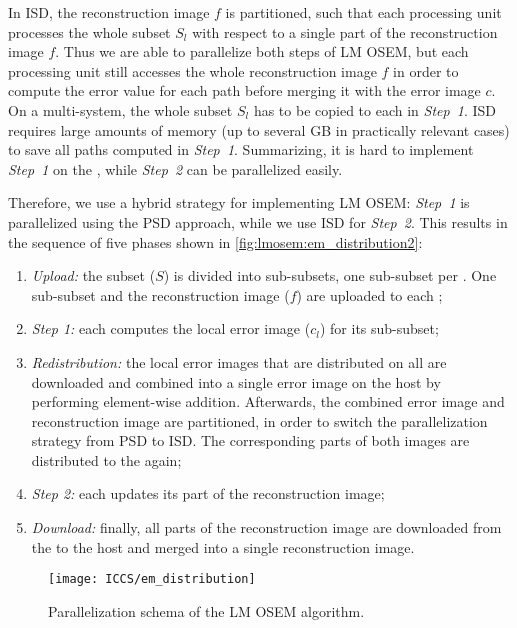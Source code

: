 In ISD, the reconstruction image $f$ is partitioned, such that each processing unit processes the whole subset $S_l$ with respect to a single part of the reconstruction image $f$.
Thus we are able to parallelize both steps of LM OSEM, but each processing unit still accesses the whole reconstruction image $f$ in order to compute the error value for each path before merging it with the error image $c$.
On a multi-\GPU system, the whole subset $S_l$ has to be copied to each \GPU in \emph{Step~1}.
ISD requires large amounts of memory (up to several GB in practically relevant cases) to save all paths computed in \emph{Step~1}.
Summarizing, it is hard to implement \emph{Step~1} on the \GPU, while \emph{Step~2} can be parallelized easily.

Therefore, we use a hybrid strategy for implementing LM OSEM:
\emph{Step~1} is parallelized using the PSD approach, while we use ISD for \emph{Step~2}.
This results in the sequence of five phases shown in \autoref{fig:lmosem:em_distribution2}:
\begin{enumerate}
\item \emph{Upload:} the subset ($S$) is divided into sub-subsets, one sub-subset per \GPU.
      One sub-subset and the reconstruction image ($f$) are uploaded to each \GPU;
\item \emph{Step 1:} each \GPU computes the local error image ($c_l$) for its sub-subset;
\item \emph{Redistribution:} the local error images that are distributed on all \GPUs are downloaded and combined into a single error image on the host by performing element-wise addition.
      Afterwards, the combined error image and reconstruction image are partitioned, in order to switch the parallelization strategy from PSD to ISD.
      The corresponding parts of both images are distributed to the \GPUs again;
\item \emph{Step 2:} each \GPU updates its part of the reconstruction image;
\item \emph{Download:} finally, all parts of the reconstruction image are downloaded from the \GPUs to the host and merged into a single reconstruction image.
\end{enumerate}

\begin{figure}
  \centering
  \texttt{[image: ICCS/em\_distribution]}
  \caption{Parallelization schema of the LM OSEM algorithm.}
  \label{fig:lmosem:em_distribution2}
\end{figure}



